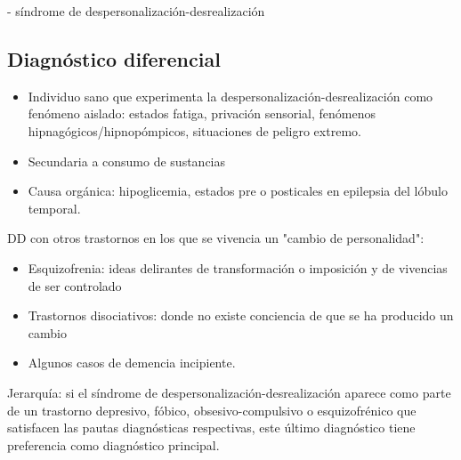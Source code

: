 - síndrome de despersonalización-desrealización
\subsection*{Diagnóstico diferencial}
\begin{itemize}
    \item Individuo sano que experimenta la despersonalización-desrealización como fenómeno aislado: estados fatiga, privación sensorial, fenómenos hipnagógicos/hipnopómpicos, situaciones de peligro extremo.
    \item Secundaria a consumo de sustancias
    \item Causa orgánica: hipoglicemia, estados pre o posticales en epilepsia del lóbulo temporal.
\end{itemize}
DD con otros trastornos en los que se vivencia un "cambio de personalidad":
\begin{itemize}
    \item Esquizofrenia: ideas delirantes de transformación o imposición y de vivencias de ser controlado
    \item Trastornos disociativos: donde no existe conciencia de que se ha producido un cambio
    \item Algunos casos de demencia incipiente.
\end{itemize}
Jerarquía: si el síndrome de despersonalización-desrealización aparece como parte de un trastorno depresivo, fóbico, obsesivo-compulsivo o esquizofrénico que satisfacen las pautas diagnósticas respectivas, este último diagnóstico tiene preferencia como diagnóstico principal.
